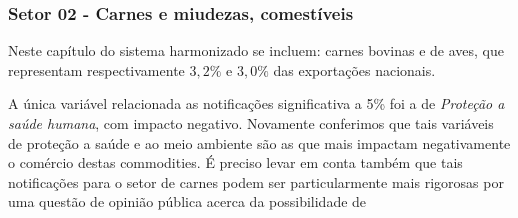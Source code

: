 % 
% 
%  
% 
% 

\subsubsection{Setor 02 - Carnes e miudezas, comestíveis}


 

Neste capítulo do sistema harmonizado se incluem: carnes bovinas e de aves, que representam respectivamente $3,2\%$ e $3,0\%$ das exportações nacionais.

A única variável relacionada as notificações significativa a 5\% foi a de \emph{Proteção a saúde humana}, com impacto negativo. Novamente conferimos que tais variáveis de proteção a saúde e ao meio ambiente são as que mais impactam negativamente o comércio destas commodities. É preciso levar em conta também que tais notificações para o setor de carnes podem ser particularmente mais rigorosas por uma questão de opinião pública acerca da possibilidade de 

